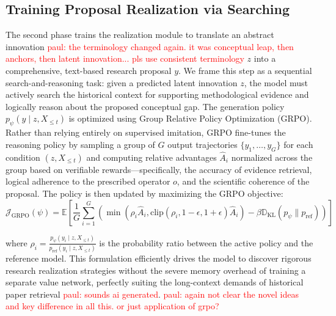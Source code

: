 \documentclass{article} %
\newcommand{\paul}[1]{\textcolor{red}{paul: #1}}
\begin{document}
\subsection{Training Proposal Realization via Searching}
The second phase trains the realization module to translate an abstract innovation \paul{the terminology changed again. it was conceptual leap, then anchors, then latent innovation... pls use consistent terminology} $z$ into a comprehensive, text-based research proposal $y$. We frame this step as a sequential search-and-reasoning task: given a predicted latent innovation $z$, the model must actively search the historical context for supporting methodological evidence and logically reason about the proposed conceptual gap. The generation policy $p_{\psi}(y \mid z, X_{\le t})$ is optimized using Group Relative Policy Optimization (GRPO). Rather than relying entirely on supervised imitation, GRPO fine-tunes the reasoning policy by sampling a group of $G$ output trajectories $\{y_1, \dots, y_G\}$ for each condition $(z, X_{\le t})$ and computing relative advantages $\hat{A}_i$ normalized across the group based on verifiable rewards—specifically, the accuracy of evidence retrieval, logical adherence to the prescribed operator $o$, and the scientific coherence of the proposal. The policy is then updated by maximizing the GRPO objective:
\begin{equation}
\mathcal{J}_{\text{GRPO}}(\psi) = \mathbb{E} \left[ \frac{1}{G} \sum_{i=1}^G \left( \min\left( \rho_i \hat{A}_i, \text{clip}(\rho_i, 1-\epsilon, 1+\epsilon) \hat{A}_i \right) - \beta \mathbb{D}_{\text{KL}}(p_\psi \| p_{\text{ref}}) \right) \right]
\end{equation}

where $\rho_i = \frac{p_\psi(y_i \mid z, X_{\le t})}{p_{\text{ref}}(y_i \mid z, X_{\le t})}$ is the probability ratio between the active policy and the reference model. This formulation efficiently drives the model to discover rigorous research realization strategies without the severe memory overhead of training a separate value network, perfectly suiting the long-context demands of historical paper retrieval \paul{sounds ai generated}. \paul{again not clear the novel ideas and key difference in all this. or just application of grpo?} 
\end{document}

